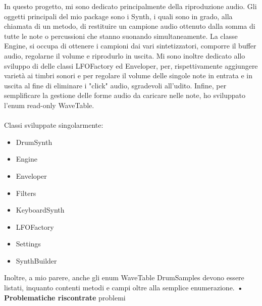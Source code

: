 \documentclass[a4paper,12pt]{report}
\begin{document}
In questo progetto, mi sono dedicato principalmente della riproduzione audio.
Gli oggetti principali del mio package sono i Synth, i quali sono in grado, alla chiamata di un metodo, di restituire un campione audio ottenuto dalla somma di tutte le note o percussioni che stanno suonando simultaneamente.
La classe Engine, si occupa di ottenere i campioni dai vari sintetizzatori, comporre il buffer audio, regolarne il volume e riprodurlo in uscita.
Mi sono inoltre dedicato allo sviluppo di delle classi LFOFactory ed Enveloper, per, rispettivamente aggiungere varietà ai timbri sonori e per regolare il volume delle singole note in entrata e in uscita al fine di eliminare i "click" audio, sgradevoli all'udito.
Infine, per semplificare la gestione delle forme audio da caricare nelle note, ho sviluppato l'enum read-only WaveTable. \\ \\
Classi sviluppate singolarmente:
{
	\begin{itemize}
		\item DrumSynth
		\item Engine
		\item Enveloper
		\item Filters
		\item KeyboardSynth
		\item LFOFactory
		\item Settings
		\item SynthBuilder
	\end{itemize}
} 
\hfill\break
Inoltre, a mio parere, anche gli enum WaveTable DrumSamples devono essere listati, inquanto contenti metodi e campi oltre alla semplice enumerazione.
\textbf{• Problematiche riscontrate}\hfill\break
problemi 
\newpage
\end{document}
